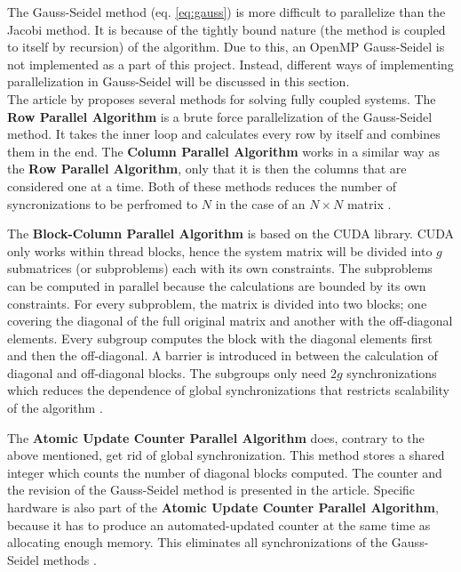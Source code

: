 The Gauss-Seidel method (eq. \ref{eq:gauss}) is more difficult to parallelize than the Jacobi method.
It is because of the tightly bound nature (the method is coupled to itself by recursion) of the algorithm. Due to this, an OpenMP Gauss-Seidel is not implemented as a part of this project. Instead, different ways of implementing parallelization in Gauss-Seidel will be discussed in this section.\\

The article  by \citeauthor{C2} proposes several methods for solving fully coupled systems.
The \textbf{Row Parallel Algorithm} is a brute force parallelization of the Gauss-Seidel method. It takes the inner loop and calculates every row by itself and combines them in the end. 
The \textbf{Column Parallel Algorithm} works in a similar way as the \textbf{Row Parallel Algorithm}, only that it is then the columns that are considered one at a time. Both of these methods reduces the number of syncronizations to be perfromed to $N$ in the case of an $N \times N$ matrix \cite{C2}.

The \textbf{Block-Column Parallel Algorithm} is based on the CUDA library. CUDA only works within thread blocks, hence the system matrix will be divided into $g$ submatrices (or subproblems) each with its own constraints. 
The subproblems can be computed in parallel because the calculations are bounded by its own constraints. 
For every subproblem, the matrix is divided into two blocks; one covering the diagonal of the full original matrix and another with the off-diagonal elements. Every subgroup computes the block with the diagonal elements first and then the off-diagonal. A barrier is introduced in between the calculation of diagonal and off-diagonal blocks.
The subgroups only need $2g$ synchronizations which reduces the dependence of global synchronizations that restricts scalability of the algorithm \cite{C2}.

The \textbf{Atomic Update Counter Parallel Algorithm} does, contrary to the above mentioned, get rid of global synchronization. 
This method stores a shared integer which counts the number of diagonal blocks computed. 
The counter and the revision of the Gauss-Seidel method is presented in the article. Specific hardware is also part of the \textbf{Atomic Update Counter Parallel Algorithm}, because it has to produce an automated-updated counter at the same time as allocating enough memory. This eliminates all synchronizations of the Gauss-Seidel methods \cite{C2}. \\ 

